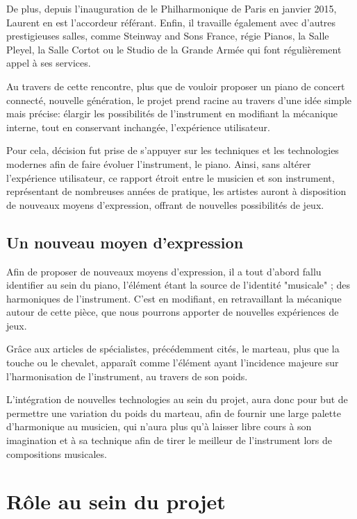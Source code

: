 \documentclass[french,a4paper,12pt]{report}
\begin{document}
	De plus, depuis l'inauguration de le Philharmonique de Paris en janvier 2015, Laurent en est l'accordeur référant. Enfin, il travaille également avec d'autres prestigieuses salles, comme Steinway and Sons France, régie Pianos, la Salle Pleyel, la Salle Cortot ou le Studio de la Grande Armée qui font régulièrement appel à ses services.	
	
	Au travers de cette rencontre, plus que de vouloir proposer un piano de concert connecté, nouvelle génération, le projet prend racine au travers d'une idée simple mais précise: élargir les possibilités de l'instrument en modifiant la mécanique interne, tout en conservant inchangée, l'expérience utilisateur.
	
	Pour cela, décision fut prise de s'appuyer sur les techniques et les technologies modernes afin de faire évoluer l'instrument, le piano.	Ainsi, sans altérer l'expérience utilisateur, ce rapport étroit entre le musicien et son instrument, représentant de nombreuses années de pratique, les artistes auront à disposition de nouveaux moyens d'expression, offrant de nouvelles possibilités de jeux.
	
	\newpage
	
		\subsection{Un nouveau moyen d'expression}
		
		Afin de proposer de nouveaux moyens d'expression, il a tout d'abord fallu identifier au sein du piano, l'élément étant la source de l'identité "musicale" ; des harmoniques de l'instrument. C'est en modifiant, en retravaillant la mécanique autour de cette pièce, que nous pourrons apporter de nouvelles expériences de jeux.
		
		Grâce aux articles de spécialistes, précédemment cités, le marteau, plus que la touche ou le chevalet, apparaît comme l'élément ayant l'incidence majeure sur l'harmonisation de l'instrument, au travers de son poids.
		
		L'intégration de nouvelles technologies au sein du projet, aura donc pour but de permettre une variation du poids du marteau, afin de fournir une large palette d'harmonique au musicien, qui n'aura plus qu'à laisser libre cours à son imagination et à sa technique afin de tirer le meilleur de l'instrument lors de compositions musicales.
	
	\section{Rôle au sein du projet}	
	
\end{document}
